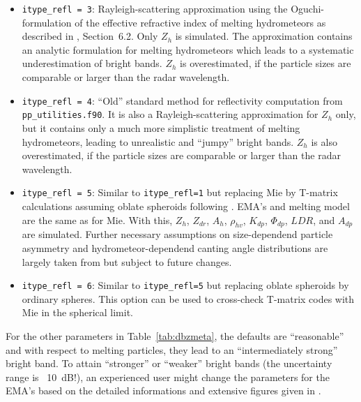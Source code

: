 \documentclass[10pt,a4paper,twoside,headinclude,footinclude,parskip=half]{scrartcl}
\newcommand{\citeP}[1]{\citet{#1}}
\newcommand{\srcform}[1]{\mbox{\texttt{#1}}\xspace}%
\newcommand{\paramform}[1]{\mbox{\texttt{#1}}\xspace}%
\begin{document}
\begin{itemize}
  If switching on the lookup table option (\srcform{llookup_mie=.TRUE.}), very good efficiency is achieved, because the (autgenerated) tables directly relate reflectivity to the prognostic
  hydrometeor moments and temperature, and, concerning efficiency, there is no reason to choose the below Rayleigh approximations any more. 
\item \srcform{itype_refl = 3}: Rayleigh-scattering approximation using the Oguchi-formulation of the effective refractive index of melting hydrometeors as described in \citeP{blahak2016a}, Section~6.2. Only $Z_h$ is simulated. The approximation contains an
  analytic formulation for melting hydrometeors which leads to a systematic underestimation of bright bands. $Z_h$ is overestimated, if the particle sizes are comparable or larger than the radar wavelength.
\item \srcform{itype_refl = 4}: ``Old'' standard method for reflectivity computation from \srcform{pp_utilities.f90}. It is also a Rayleigh-scattering approximation for $Z_h$ only, but it contains only a much more simplistic treatment
  of melting hydrometeors, leading to unrealistic and ``jumpy'' bright bands. $Z_h$ is also overestimated, if the particle sizes are comparable or larger than the radar wavelength.
\item \srcform{itype_refl = 5}: Similar to \paramform{itype_refl=1} but replacing Mie by T-matrix calculations assuming oblate spheroids following \citeP{ryzhkov2001,ryzhkov2011}. EMA's and melting model are the same as for Mie.
  With this, $Z_h$, $Z_{dr}$, $A_h$, $\rho_{hv}$, $K_{dp}$, $\Phi_{dp}$, $LDR$, and $A_{dp}$ are simulated.
  Further necessary assumptions on size-dependend particle asymmetry and hydrometeor-dependend canting angle distributions are largely taken from \citeP{ryzhkov2011} but subject to future changes.
\item \srcform{itype_refl = 6}: Similar to \paramform{itype_refl=5} but replacing oblate spheroids by ordinary spheres. This option can be used to cross-check T-matrix codes with Mie in the spherical limit.
\end{itemize}
For the other parameters in Table~\ref{tab:dbzmeta}, the defaults are ``reasonable'' and with respect to melting particles, they lead to an ``intermediately strong'' bright band.
To attain ``stronger'' or ``weaker'' bright bands (the uncertainty range is ~10~dB!), an experienced user might change the parameters for the EMA's based on
the detailed informations and extensive figures given in \citeP{blahak2016a}.
\end{document}
